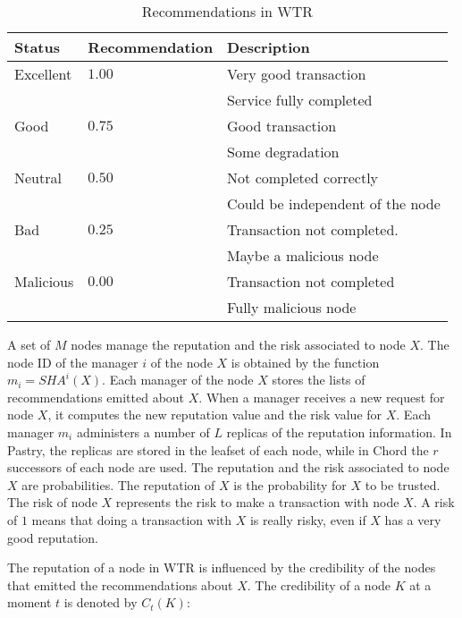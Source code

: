   \begin{table}
    \centering
    \footnotesize
    \begin{tabular}{|l|l|l|}
      \hline
      \textbf{Status} & \textbf{Recommendation} & \textbf{Description}\\
      \hline
      Excellent  & $1.00$    & Very good transaction\\
                &           & Service fully completed\\
      Good      & $0.75$    & Good transaction\\
                &           & Some degradation\\
      Neutral   & $0.50$     & Not completed correctly\\
                &           & Could be independent of the node\\
      Bad       & $0.25$    & Transaction not completed.\\
                &           & Maybe a malicious node\\
      Malicious & $0.00$    & Transaction not completed\\
                &           & Fully malicious node\\
      \hline
    \end{tabular}
    \caption{Recommendations in WTR}
    \label{table:wtr_recomendations}
  \end{table}

A set of $M$ nodes manage the reputation and the risk associated to node $X$.
The node ID of the manager $i$ of the node $X$ is
obtained by the function $m_i = SHA^{i}(X)$. Each manager of the node $X$
stores the lists of recommendations emitted about $X$. When a manager receives a
new request for node $X$, it computes the new reputation value and the risk
value for $X$.
Each manager $m_i$ administers a number of $L$ replicas of the reputation information. In Pastry,
the replicas are stored in the leafset of each node, while in Chord the $r$
successors of each node are used.
The reputation and the risk associated to node $X$ are probabilities. The
reputation of $X$ is the probability for $X$ to be trusted. The risk of node
$X$ represents the risk to make a transaction with node $X$. A risk of $1$
means that doing a transaction with $X$ is really risky, even if $X$ has a very
good reputation.

The reputation of a node in WTR is influenced by the credibility of the nodes
that emitted the recommendations about $X$. The credibility of a node $K$ at a
moment $t$ is denoted by $C_t (K)$:%

